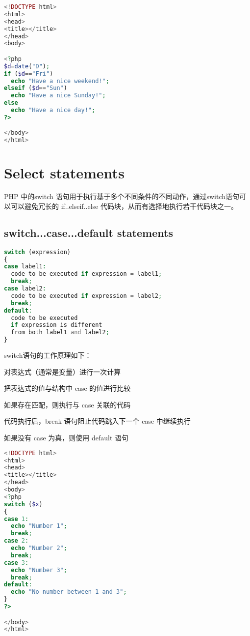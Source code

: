 \begin{lstlisting}[language=PHP]
<!DOCTYPE html>
<html>
<head>
<title></title>
</head>
<body>

<?php
$d=date("D");
if ($d=="Fri")
  echo "Have a nice weekend!"; 
elseif ($d=="Sun")
  echo "Have a nice Sunday!"; 
else
  echo "Have a nice day!"; 
?>

</body>
</html>
\end{lstlisting}



\section{Select statements}

PHP 中的switch 语句用于执行基于多个不同条件的不同动作，通过switch语句可以可以避免冗长的 if..elseif..else 代码块，从而有选择地执行若干代码块之一。


\subsection{switch...case...default statements}



\begin{lstlisting}[language=PHP]
switch (expression)
{
case label1:
  code to be executed if expression = label1;
  break;  
case label2:
  code to be executed if expression = label2;
  break;
default:
  code to be executed
  if expression is different 
  from both label1 and label2;
}
\end{lstlisting}

switch语句的工作原理如下：

\begin{compactenum}
\item 对表达式（通常是变量）进行一次计算
\item 把表达式的值与结构中 case 的值进行比较
\item 如果存在匹配，则执行与 case 关联的代码
\item 代码执行后，break 语句阻止代码跳入下一个 case 中继续执行
\item 如果没有 case 为真，则使用 default 语句
\end{compactenum}


\begin{lstlisting}[language=PHP]
<!DOCTYPE html>
<html>
<head>
<title></title>
</head>
<body>
<?php
switch ($x)
{
case 1:
  echo "Number 1";
  break;
case 2:
  echo "Number 2";
  break;
case 3:
  echo "Number 3";
  break;
default:
  echo "No number between 1 and 3";
}
?>

</body>
</html>
\end{lstlisting}


